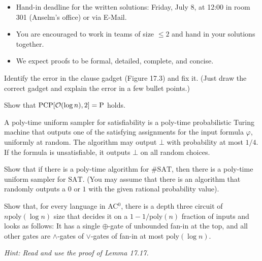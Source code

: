\documentclass[english]{uebung_cs}
\begin{document}
\begin{itemize}
  \item Hand-in deadline for the written solutions: Friday, July 8, at 12:00 in room 301 (Anselm's office) or via E-Mail.
  \item You are encouraged to work in teams of size $\le 2$ and hand in your solutions together.
  \item We expect proofs to be formal, detailed, complete, and concise.
\end{itemize}

\begin{aufgabe}
  Identify the error in the clause gadget (Figure 17.3) and fix it. (Just draw the correct gadget and explain the error in a few bullet points.)
\end{aufgabe}

\begin{aufgabe}
  Show that $\mathrm{PCP}[\mathcal{O}(\log n),2] = \mathrm{P}$ holds.
\end{aufgabe}

\begin{aufgabe}
  A poly-time uniform sampler for satisfiability is a poly-time probabilistic Turing machine
  that outputs one of the satisfying assignments for the input formula
  $\varphi$, uniformly at random. The algorithm may output $\bot$ with
  probability at most $1/4$. If the formula is unsatisfiable, it
  outputs $\bot$ on all random choices.

  Show that if there is a poly-time algorithm for $\#\mathrm{SAT}$, then there is a poly-time uniform sampler for $\mathrm{SAT}$. (You may assume that there is an algorithm that randomly outputs a $0$ or $1$ with the given rational probability value).
\end{aufgabe}

\begin{aufgabe}[Exercise 17.6]
Show that, for every language in AC$^0$, there is a depth three circuit of $n \mathrm{poly}(\log n)$ size that decides it on a $1−1/\mathrm{poly}(n)$ fraction of inputs and looks as follows:
It has a single $\oplus$-gate of unbounded fan-in at the top, and all other gates are $\wedge$-gates of $\vee$-gates of fan-in at most $\mathrm{poly}(\log n)$.

\emph{Hint: Read and use the proof of Lemma 17.17.}
\end{aufgabe}
\end{document}
